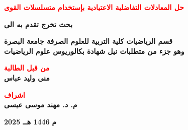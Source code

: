 \begin{titlepage}
	\vspace{1cm}
	
	\begin{center}
		\quranfont
		\Large \textbf{\textcolor{red}{حل المعادلات التفاضلية الاعتيادية بإستخدام متسلسلات القوى}}\\
		\large \textbf{\LR{\textcolor{red}{Solving Ordinary Differential Equations using Power Series}}}
	\end{center}
	\vfill
	
	\begin{center}
		\large
		\textbf{بحث تخرج تقدم به الى}
	\end{center}
	
	\begin{center}
		\large
		\textbf{قسم الرياضيات كلية التربية للعلوم الصرفة جامعة البصرة\\
			\vspace{6pt}
			وهو جزء من متطلبات نيل شهادة بكالوريوس علوم الرياضيات}
	\end{center}
	\vfill
	\begin{center}
		\large
\textbf{\textcolor{red}{من قبل الطالبة}}\\
		\vspace{8pt}
		\large
		\textbf{منى وليد عباس}
	\end{center}
	\vspace{10pt}
	\begin{center}
		\large
\textbf{\textcolor{red}{اشراف}}\\
		\vspace{8pt}
		\large
		\textbf{م. د. مهند موسى عيسى}
	\end{center}
	\vspace{80pt}
	\begingroup
	\large{\raggedleft \textbf{2025 م}} {\hfill \textbf{1446 هــ}}
	\endgroup
\end{titlepage}
\restoregeometry